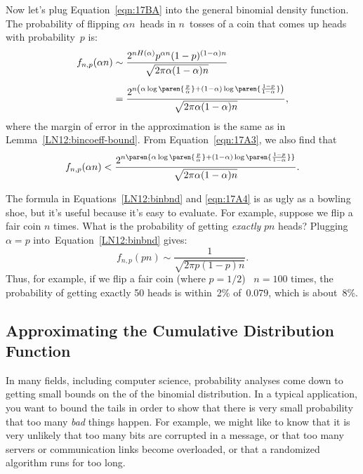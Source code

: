 \begin{editingnotes}
Now let's plug Equation~\ref{eqn:17BA} into the general binomial density
function.  The probability of flipping $\alpha n$~heads in $n$~tosses
of a coin that comes up heads with probability~$p$ is:
\begin{align}
f_{n, p}(\alpha n)
    &\sim \frac{ 2^{n H(\alpha)} p^{\alpha n} (1 - p)^{(1 - \alpha)n} }
            { \sqrt{2 \pi \alpha (1 - \alpha) n} } \notag\\[4pt]
    &= \frac{ 2^{n \left(\alpha \log\paren{\frac{p}{\alpha}}
                    + (1 - \alpha) \log\paren{\frac{1 - p}{1 - \alpha}}\right)} 
            }
            { \sqrt{2 \pi \alpha (1 - \alpha) n} }, \label{LN12:binbnd}
\end{align}
where the margin of error in the approximation is the same as in
Lemma~\ref{LN12:bincoeff-bound}.  From Equation~\ref{eqn:17A3}, we
also find that
\begin{equation}\label{eqn:17A4}
    f_{n, p}(\alpha n) < \frac{ 2^{n \paren{\alpha
        \log\paren{\frac{p}{\alpha}} + (1 - \alpha) \log\paren{\frac{1
          - p}{1 - \alpha}}}} }
                              { \sqrt{2 \pi \alpha (1 - \alpha) n} }.
\end{equation}

The formula in Equations~\ref{LN12:binbnd} and \ref{eqn:17A4} is as
ugly as a bowling shoe, but it's useful because it's easy to evaluate.
For example, suppose we flip a fair coin $n$ times.  What is the
probability of getting \emph{exactly} $pn$ heads?  Plugging $\alpha =
p$ into~Equation~\ref{LN12:binbnd} gives:
%
\begin{equation*}
f_{n, p}(pn)
    \sim \frac{1}{\sqrt{2 \pi p (1 - p) n} }.
\end{equation*}
%
Thus, for example, if we flip a fair coin (where $p = 1/2$) \ $n =
100$ times, the probability of getting exactly 50 heads is within~2\%
of~$0.079$, which is about~8\%.

\subsection{Approximating the Cumulative Distribution Function}

In many fields, including computer science, probability analyses come
down to getting small bounds on the  of the binomial
distribution.  In a typical application, you want to bound the tails
in order to show that there is very small probability that too many
\emph{bad} things happen.  For example, we might like to know that it
is very unlikely that too many bits are corrupted in a message, or
that too many servers or communication links become overloaded, or
that a randomized algorithm runs for too long.


\end{editingnotes}
